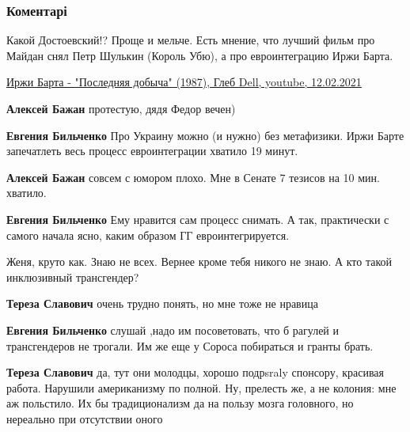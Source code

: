  
 
 
 
 
\subsubsection{Коментарі}

\begin{itemize} %

Какой Достоевский!? Проще и мельче. Есть мнение, что лучший фильм про Майдан
снял Петр Шулькин (Король Убю), а про евроинтеграцию Иржи Барта. 

\href{https://www.youtube.com/watch?v=U5ow2_HFqK0}{%
Иржи Барта - "Последняя добыча" (1987), Глеб Dell, youtube, 12.02.2021%
}

\begin{itemize} %
\textbf{Алексей Бажан} протестую, дядя Федор вечен)

\textbf{Евгения Бильченко} Про Украину можно (и нужно) без метафизики. Иржи Барте запечатлеть весь процесс евроинтеграции хватило 19 минут.


\textbf{Алексей Бажан} совсем с юмором плохо. Мне в Сенате 7 тезисов на 10 мин. хватило.

\textbf{Евгения Бильченко} Ему нравится сам процесс снимать. А так, практически с самого начала ясно, каким образом ГГ евроинтегрируется.
\end{itemize} %


Женя, круто как. Знаю не всех. Вернее кроме тебя никого не знаю. А кто такой
инклюзивный трансгендер?

\begin{itemize} %
\textbf{Тереза Славович} очень трудно понять, но мне тоже не нравица

\textbf{Евгения Бильченко} слушай ,надо им посоветовать, что б рагулей и трансгендеров не трогали. Им же еще у Сороса побираться и гранты брать.


\textbf{Тереза Славович} да, тут они молодцы, хорошо подрsraly спонсору, красивая работа. Нарушили американизму по полной. Ну, прелесть же, а не колония: мне аж польстило. Их бы традиционализм да на пользу мозга головного, но нереально при отсутствии оного
\end{itemize} %


\end{itemize}
